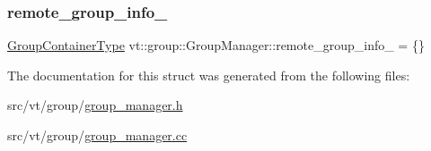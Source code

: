 \mbox{\label{structvt_1_1group_1_1_group_manager_a970a1f928ab59533e256a30f1426ccee}} 
\subsubsection{\texorpdfstring{remote\+\_\+group\+\_\+info\+\_\+}{remote\_group\_info\_}}
{\footnotesize\ttfamily \hyperlink{structvt_1_1group_1_1_group_manager_a9e2a0989865f4097bb5edd390865555e}{Group\+Container\+Type} vt\+::group\+::\+Group\+Manager\+::remote\+\_\+group\+\_\+info\+\_\+ = \{\}\hspace{0.3cm}{\ttfamily [private]}}



The documentation for this struct was generated from the following files\+:\begin{DoxyCompactItemize}
\item 
src/vt/group/\hyperlink{group__manager_8h}{group\+\_\+manager.\+h}\item 
src/vt/group/\hyperlink{group__manager_8cc}{group\+\_\+manager.\+cc}\end{DoxyCompactItemize}
